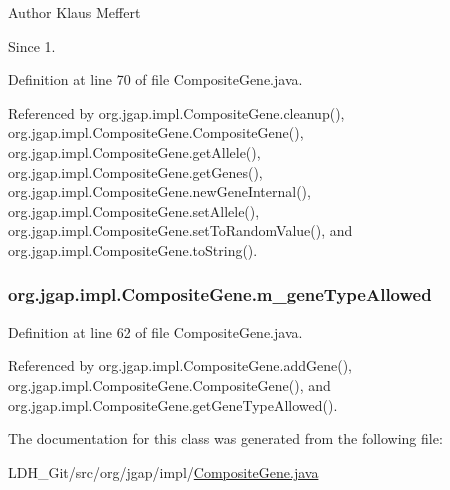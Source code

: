 \begin{DoxyAuthor}{Author}
Klaus Meffert 
\end{DoxyAuthor}
\begin{DoxySince}{Since}
1. 
\end{DoxySince}


Definition at line 70 of file Composite\-Gene.\-java.



Referenced by org.\-jgap.\-impl.\-Composite\-Gene.\-cleanup(), org.\-jgap.\-impl.\-Composite\-Gene.\-Composite\-Gene(), org.\-jgap.\-impl.\-Composite\-Gene.\-get\-Allele(), org.\-jgap.\-impl.\-Composite\-Gene.\-get\-Genes(), org.\-jgap.\-impl.\-Composite\-Gene.\-new\-Gene\-Internal(), org.\-jgap.\-impl.\-Composite\-Gene.\-set\-Allele(), org.\-jgap.\-impl.\-Composite\-Gene.\-set\-To\-Random\-Value(), and org.\-jgap.\-impl.\-Composite\-Gene.\-to\-String().

\hypertarget{classorg_1_1jgap_1_1impl_1_1_composite_gene_a490eb7a6c703d4f20bbbe4d25b78eea3}{
\subsubsection[{m\-\_\-gene\-Type\-Allowed}]{ org.\-jgap.\-impl.\-Composite\-Gene.\-m\-\_\-gene\-Type\-Allowed\hspace{0.3cm}{\ttfamily [private]}}}\label{classorg_1_1jgap_1_1impl_1_1_composite_gene_a490eb7a6c703d4f20bbbe4d25b78eea3}


Definition at line 62 of file Composite\-Gene.\-java.



Referenced by org.\-jgap.\-impl.\-Composite\-Gene.\-add\-Gene(), org.\-jgap.\-impl.\-Composite\-Gene.\-Composite\-Gene(), and org.\-jgap.\-impl.\-Composite\-Gene.\-get\-Gene\-Type\-Allowed().



The documentation for this class was generated from the following file\-:\begin{DoxyCompactItemize}
\item 
L\-D\-H\-\_\-\-Git/src/org/jgap/impl/\hyperlink{_composite_gene_8java}{Composite\-Gene.\-java}\end{DoxyCompactItemize}
